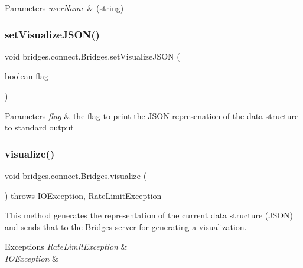 \begin{DoxyParams}{Parameters}
{\em user\+Name} & (string) \\
\hline
\end{DoxyParams}
\mbox{\label{classbridges_1_1connect_1_1_bridges_aa502aa32a9ac482da9c8455c6810b64d}} 
\subsubsection{\texorpdfstring{setVisualizeJSON()}{setVisualizeJSON()}}
{\footnotesize\ttfamily void bridges.\+connect.\+Bridges.\+set\+Visualize\+J\+S\+ON (\begin{DoxyParamCaption}\item[{boolean}]{flag }\end{DoxyParamCaption})}


\begin{DoxyParams}{Parameters}
{\em flag} & the flag to print the J\+S\+ON represenation of the data structure to standard output \\
\hline
\end{DoxyParams}
\mbox{\label{classbridges_1_1connect_1_1_bridges_a1853d64ffb8675ba2ec227a2b819cd24}} 
\subsubsection{\texorpdfstring{visualize()}{visualize()}}
{\footnotesize\ttfamily void bridges.\+connect.\+Bridges.\+visualize (\begin{DoxyParamCaption}{ }\end{DoxyParamCaption}) throws I\+O\+Exception, \mbox{\hyperlink{classbridges_1_1validation_1_1_rate_limit_exception}{Rate\+Limit\+Exception}}}

This method generates the representation of the current data structure (J\+S\+ON) and sends that to the \mbox{\hyperlink{classbridges_1_1connect_1_1_bridges}{Bridges}} server for generating a visualization.


\begin{DoxyExceptions}{Exceptions}
{\em Rate\+Limit\+Exception} & \\
\hline
{\em I\+O\+Exception} & \\
\hline
\end{DoxyExceptions}
\mbox{\label{classbridges_1_1connect_1_1_bridges_afd3c63780396e92c94c923037385b31d}} 
